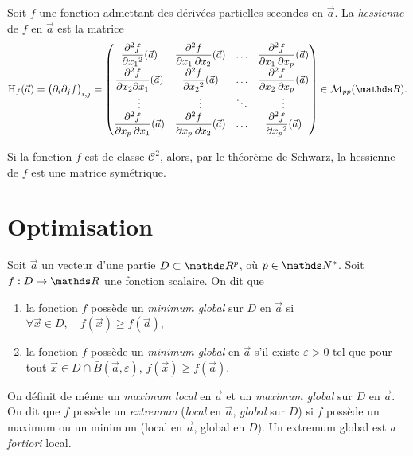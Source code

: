 \begin{defn}
	Soit $f$ une fonction admettant des dérivées partielles secondes en $\vec{a}$. La \textit{hessienne} de $f$ en $\vec{a}$ est la matrice \[
		\mathrm{H}_f(\vec{a}) = \big(\partial_i \partial_j f\big)_{i,j} = \begin{pmatrix}
			\ds\frac{\partial^2 f}{\partial x_1{}^2}(\vec{a}) & \ds \frac{\partial^2 f}{\partial x_1\:\partial x_2}(\vec{a}) & \ds\ldots & \ds\frac{\partial^2 f}{\partial x_1\: \partial x_p} (\vec{a})\\
			\ds \frac{\partial^2 f}{\partial x_2 \partial x_1}(\vec{a}) & \ds \frac{\partial^2 f}{\partial x_2{}^2}(\vec{a}) & \ds\ldots & \ds\frac{\partial^2 f}{\partial x_2\:\partial x_p}(\vec{a})\\
			\vdots & \vdots & \ddots & \vdots\\
			\ds\frac{\partial^2 f}{\partial x_p\:\partial x_1}(\vec{a}) & \ds\frac{\partial^2 f}{\partial x_p\:\partial x_2}(\vec{a}) & \ds \ldots & \ds \frac{\partial^2 f}{\partial x_p{}^2}(\vec{a})
		\end{pmatrix} \in \mathcal{M}_{pp}(\R)
	.\]
\end{defn}

Si la fonction $f$ est de classe $\mathcal{C}^2$, alors, par le théorème de Schwarz, la hessienne de $f$ est une matrice symétrique.

\section{Optimisation}

\begin{defn}
	Soit $\vec{a}$ un vecteur d'une partie $D \subset \R^p$, où $p \in \N^*$. Soit $f : D \to \R$ une fonction scalaire. On dit que
	\begin{enumerate}
		\item la fonction $f$ possède un \textit{minimum global} sur $D$ en $\vec{a}$ si \hfill $\forall \vec{x} \in D,\quad f(\vec{x}) \ge f(\vec{a})$,\hfill\null
		\item la fonction $f$ possède un \textit{minimum global} en $\vec{a}$ s'il existe $\varepsilon > 0$ tel que pour tout $\vec{x} \in D \cap \bar{B}(\vec{a}, \varepsilon)$, $f(\vec{x}) \ge f(\vec{a})$.
	\end{enumerate}
\end{defn}

On définit de même un \textit{maximum local} en $\vec{a}$ et un \textit{maximum global} sur $D$ en $\vec{a}$. On dit que $f$ possède un \textit{extremum} (\textit{local} en $\vec{a}$, \textit{global} sur $D$) si $f$ possède un maximum ou un minimum (local en $\vec{a}$, global en $D$).
Un extremum global est \textit{a fortiori} local.

